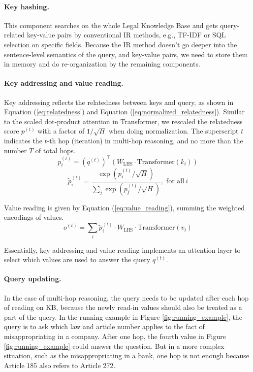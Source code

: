 \documentclass{article}
\begin{document}
\paragraph{Key hashing.} 
This component searches on the whole Legal Knowledge Base and gets query-related key-value pairs by conventional IR methods, e.g., TF-IDF or SQL selection on specific fields. 
Because the IR method doesn't go deeper into the sentence-level semantics of the query, and key-value pairs, we need to store them in memory and do re-organization by the remaining components.

\paragraph{Key addressing and value reading.}  
Key addressing reflects the relatedness between keys and query, as shown in Equation (\ref{eq:relatedness}) and Equation (\ref{eq:normalized_relatedness}). 
Similar to the scaled dot-product attention in Transformer, we rescaled the relatedness score $p^{(t)}$ with a factor of $1/\sqrt{H}$ when doing normalization. 
The superscript $t$ indicates the $t$-th hop (iteration) in multi-hop reasoning, and no more than the number $T$ of total hops.
\begin{equation}
p^{(t)}_i = (q^{(t)})^\top (W_{\text{LHS}} \cdot \text{Transformer}(k_i))
\label{eq:relatedness}
\end{equation}
\begin{equation}
\tilde{p}^{(t)}_i = \frac{\exp{(p^{(t)}_i/\sqrt{H} )}}{ \sum_{j} \exp{(p^{(t)}_j/\sqrt{H} )} }, \text{ for all}\ i
\label{eq:normalized_relatedness}
\end{equation}

Value reading is given by Equation (\ref{eq:value_reading}), summing the weighted encodings of values. 
\begin{equation}
o^{(t)} = \sum_{i} \tilde{p}^{(t)}_i \cdot W_{\text{LHS}} \cdot \text{Transformer}(v_i)
\label{eq:value_reading}
\end{equation}

Essentially, key addressing and value reading implements an attention layer to select which values are used to answer the query $q^{(t)}$. 

\paragraph{Query updating.} 
In the case of multi-hop reasoning, the query needs to be updated after each hop of reading on KB, because the newly read-in values should also be treated as a part of the query. 
In the running example in Figure \ref{fig:running_example}, the query is to ask which law and article number applies to the fact of misappropriating in a company. 
After one hop, the fourth value in Figure \ref{fig:running_example} could answer the question. 
But in a more complex situation, such as the misappropriating in a bank, one hop is not enough because Article 185 also refers to Article 272. 
\end{document}
